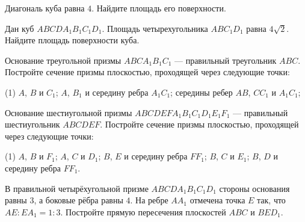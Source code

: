 \begin{class}[number=4]
	\begin{listofex}
		\item Диагональ куба равна \( 4 \). Найдите площадь его поверхности.
		\item Дан куб \( ABCDA_1B_1C_1D_1 \). Площадь четырехугольника \( ABC_1D_1 \) равна \( 4\sqrt{2} \). Найдите площадь поверхности куба.
		\item Основание треугольной призмы \( ABCA_1B_1C_1 \) ---
		правильный треугольник \( ABC \).
		Постройте сечение призмы плоскостью,
		проходящей через следующие точки:
		\begin{tasks}(1)
			\task \( A \), \( B \) и \( C_1 \);
			\task \( A \), \( B_1 \) и середину ребра \( A_1C_1 \);
			\task середины ребер \( AB \), \( CC_1 \) и \( A_1C_1 \);
		\end{tasks}
		\item Основание шестиугольной призмы \( ABCDEFA_1B_1C_1D_1E_1F_1 \) ---
		правильный шестиугольник \( ABCDEF \).
		Постройте сечение призмы плоскостью,
		проходящей через следующие точки:
		\begin{tasks}(1)
			\task \( A \), \( B \) и \( F_1 \);
			\task \( A \), \( C \) и \( D_1 \);
			\task \( B \), \( E \) и середину ребра \( FF_1 \);
			\task \( B \), \( C \) и \( E_1 \);
			\task \( B \), \( D \) и середину ребра \( FF_1 \).
		\end{tasks}
		\item В правильной четырёхугольной призме \(ABCDA_1B_1C_1D_1\) стороны основания равны \(3\), а боковые рёбра равны \(4\). На ребре \(AA_1\) отмечена точка \(E\) так, что \(AE :EA_1 = 1:3\). Постройте прямую пересечения плоскостей \(ABC\) и \(BED_1\).
	\end{listofex}
\end{class}

